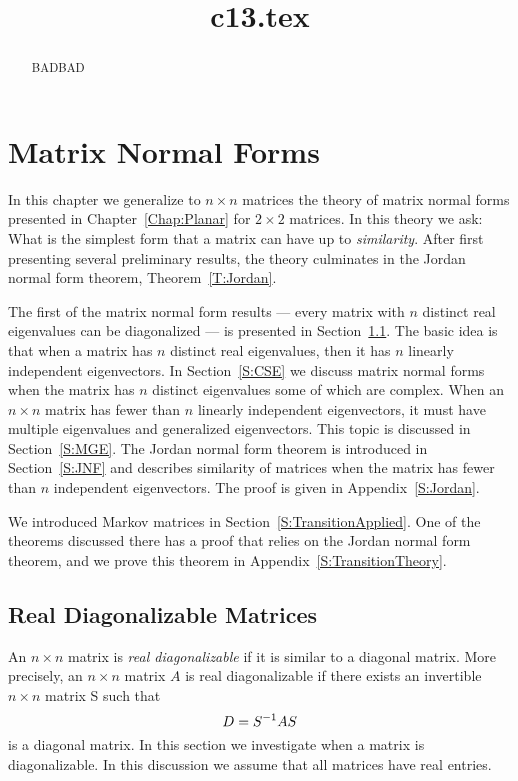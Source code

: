 \documentclass{ximera}
\title{c13.tex}
\begin{document}
\begin{abstract}
BADBAD
\end{abstract}
\maketitle

\chapter{Matrix Normal Forms}
\label{C:HDeigenvalues}

\normalsize
 
In this chapter we generalize to $n\times n$ matrices the theory of matrix 
normal forms presented in Chapter~\ref{Chap:Planar} for $2\times 2$ 
matrices.  In this theory we ask: What is the simplest form that a matrix 
can have up to {\em similarity\/}.  After first presenting several 
preliminary results, the theory culminates in the Jordan normal form theorem, Theorem~\ref{T:Jordan}. 

The first of the matrix normal form results --- every matrix with 
$n$ distinct real eigenvalues can be diagonalized --- is presented 
in Section~\ref{S:RDM}.  The basic idea is that when a matrix has $n$
distinct real eigenvalues, then it has $n$ linearly independent 
eigenvectors.  In Section~\ref{S:CSE} we discuss matrix normal forms 
when the matrix has $n$ distinct eigenvalues some of which are complex.  
When an $n\times n$ matrix has fewer than $n$ linearly independent 
eigenvectors, it must have multiple eigenvalues and generalized eigenvectors.  
This topic is discussed in Section~\ref{S:MGE}.  The Jordan normal form theorem 
is introduced in Section~\ref{S:JNF} and describes similarity of matrices when 
the matrix has fewer than $n$ independent eigenvectors.  The proof is 
given in Appendix~\ref{S:Jordan}.

We introduced Markov matrices in Section~\ref{S:TransitionApplied}.  
One of the theorems discussed there has a proof that relies on the 
Jordan normal form theorem, and we prove this theorem in 
Appendix~\ref{S:TransitionTheory}.
 




\section{Real Diagonalizable Matrices} 
\label{S:RDM}

An $n\times n$ matrix is {\em real diagonalizable\/}
 if it is similar  to a
diagonal matrix.  More precisely, 
an $n\times n$ matrix $A$ is
real diagonalizable if there exists an invertible $n\times n$
matrix S such that
\[
D=S^{-1} AS
\]
is a diagonal matrix.  In this section we investigate when a
matrix is diagonalizable.  In this discussion we assume that all
matrices have real entries.
\end{document}
